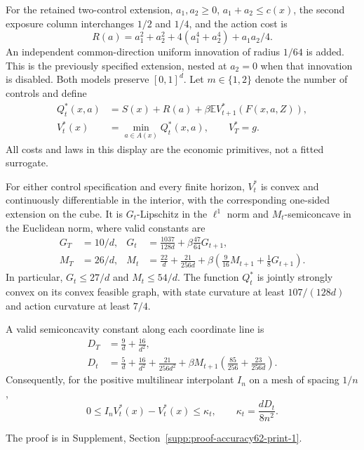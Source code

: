 For the retained two-control extension, $a_1,a_2\ge0$, $a_1+a_2\le c(x)$, the second exposure column interchanges $1/2$ and $1/4$, and the action cost is
\[
 R(a)=a_1^2+a_2^2+4(a_1^4+a_2^4)+a_1a_2/4.
\]
An independent common-direction uniform innovation of radius $1/64$ is added. This is the previously specified extension, nested at $a_2=0$ when that innovation is disabled. Both models preserve $[0,1]^d$. Let $m\in\{1,2\}$ denote the number of controls and define
\begin{align*}
 Q_t^*(x,a)&=S(x)+R(a)+\beta\mathbb E V_{t+1}^*(F(x,a,Z)),\\
 V_t^*(x)&=\min_{a\in A(x)}Q_t^*(x,a),\qquad V_T^*=g.
\end{align*}
All costs and laws in this display are the economic primitives, not a fitted surrogate.

\begin{theorem}\label{thm:regularity62}
For either control specification and every finite horizon, $V_t^*$ is convex and continuously differentiable in the interior, with the corresponding one-sided extension on the cube. It is $G_t$-Lipschitz in the $\ell^1$ norm and $M_t$-semiconcave in the Euclidean norm, where valid constants are
\begin{align*}
 G_T&=10/d,&G_t&=\frac{1037}{128d}+\beta\frac{47}{64}G_{t+1},\\
 M_T&=26/d,&M_t&=\frac{22}{d}+\frac{21}{256d}
             +\beta\left(\frac9{16}M_{t+1}+\frac18G_{t+1}\right).
\end{align*}
In particular, $G_t\le27/d$ and $M_t\le54/d$. The function $Q_t^*$ is jointly strongly convex on its convex feasible graph, with state curvature at least $107/(128d)$ and action curvature at least $7/4$.

A valid semiconcavity constant along each coordinate line is
\begin{align*}
 D_T&=\frac9d+\frac{16}{d^2},\\
 D_t&=\frac5d+\frac{16}{d^2}+\frac{21}{256d^2}
 +\beta M_{t+1}\left(\frac{85}{256}+\frac{23}{256d}\right).
\end{align*}
Consequently, for the positive multilinear interpolant $I_n$ on a mesh of spacing $1/n$,
\begin{equation}\label{eq:interpolation62}
 0\le I_nV_t^*(x)-V_t^*(x)\le\kappa_t,
 \qquad \kappa_t=\frac{dD_t}{8n^2}.
\end{equation}
\end{theorem}

\noindent The proof is in Supplement, Section~\ref{supp:proof-accuracy62-print-1}.


